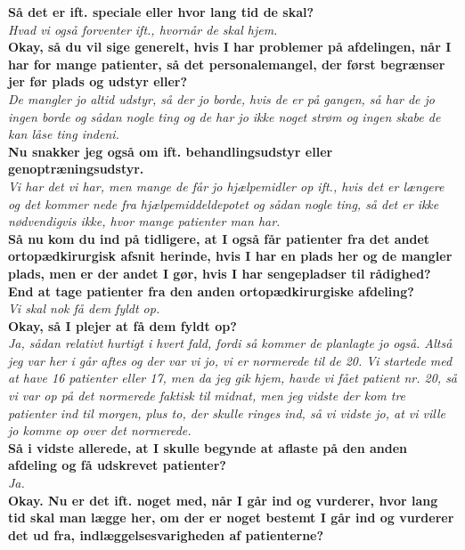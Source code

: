 \noindent
\textbf{Så det er ift. speciale eller hvor lang tid de skal?} \\
\noindent
\textit{Hvad vi også forventer ift., hvornår de skal hjem.} \\
\noindent
\textbf{Okay, så du vil sige generelt, hvis I har problemer på afdelingen, når I har for mange patienter, så det personalemangel, der først begrænser jer før plads og udstyr eller?} \\
\noindent
\textit{De mangler jo altid udstyr, så der jo borde, hvis de er på gangen, så har de jo ingen borde og sådan nogle ting og de har jo ikke noget strøm og ingen skabe de kan låse ting indeni.} \\
\noindent
\textbf{ Nu snakker jeg også om ift. behandlingsudstyr eller genoptræningsudstyr.} \\
\noindent
\textit{Vi har det vi har, men mange de får jo hjælpemidler op ift., hvis det er længere og det kommer nede fra hjælpemiddeldepotet og sådan nogle ting, så det er ikke nødvendigvis ikke, hvor mange patienter man har.} \\
\noindent
\textbf{Så nu kom du ind på tidligere, at I også får patienter fra det andet ortopædkirurgisk afsnit herinde, hvis I har en plads her og de mangler plads, men er der andet I gør, hvis I har sengepladser til rådighed? End at tage patienter fra den anden ortopædkirurgiske afdeling? } \\
\noindent
\textit{Vi skal nok få dem fyldt op. } \\
\noindent
\textbf{Okay, så I plejer at få dem fyldt op? } \\
\noindent
\textit{Ja, sådan relativt hurtigt i hvert fald, fordi så kommer de planlagte jo også. Altså jeg var her i går aftes og der var vi jo, vi er normerede til de 20. Vi startede med at have 16 patienter eller 17, men da jeg gik hjem, havde vi fået patient nr. 20, så vi var op på det normerede faktisk til midnat, men jeg vidste der kom tre patienter ind til morgen, plus to, der skulle ringes ind, så vi vidste jo, at vi ville jo komme op over det normerede.} \\
\noindent
\textbf{Så i vidste allerede, at I skulle begynde at aflaste på den anden afdeling og få udskrevet patienter?} \\
\noindent
\textit{Ja.} \\
\noindent
\textbf{Okay. Nu er det ift. noget med, når I går ind og vurderer, hvor lang tid skal man lægge her, om der er noget bestemt I går ind og vurderer det ud fra, indlæggelsesvarigheden af patienterne?} \\
